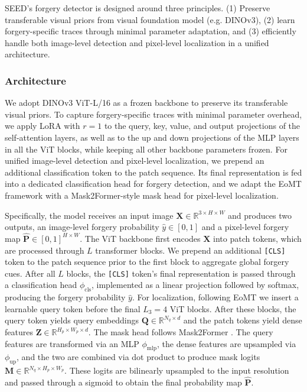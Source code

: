 \documentclass[sigconf, screen, review, anonymous]{acmart}
\begin{document}
SEED's forgery detector is designed around three principles. (1) Preserve transferable visual priors from visual foundation model (e.g. DINOv3), (2) learn forgery-specific traces through minimal parameter adaptation, and (3) efficiently handle both image-level detection and pixel-level localization in a unified architecture.

\subsubsection{Architecture}

We adopt DINOv3 ViT-L/16 \cite{simeoni2025dinov3} as a frozen backbone to preserve its transferable visual priors. To capture forgery-specific traces with minimal parameter overhead, we apply LoRA \cite{hu2021lora} with $r=1$ to the query, key, value, and output projections of the self-attention layers, as well as to the up and down projections of the MLP layers in all the ViT blocks, while keeping all other backbone parameters frozen. For unified image-level detection and pixel-level localization, we prepend an additional classification token to the patch sequence. Its final representation is fed into a dedicated classification head for forgery detection, and we adapt the EoMT framework \cite{kerssies2025your} with a Mask2Former-style mask head for pixel-level localization.

Specifically, the model receives an input image $\mathbf{X} \in \mathbb{R}^{3 \times H \times W}$ and produces two outputs, an image-level forgery probability $\hat{y} \in [0,1]$ and a pixel-level forgery map $\hat{\mathbf{P}} \in [0,1]^{H \times W}$. The ViT backbone first encodes $\mathbf{X}$ into patch tokens, which are processed through $L$ transformer blocks. We prepend an additional \texttt{[CLS]} token to the patch sequence prior to the first block to aggregate global forgery cues. After all $L$ blocks, the \texttt{[CLS]} token's final representation is passed through a classification head $\phi_{\text{cls}}$, implemented as a linear projection followed by softmax, producing the forgery probability $\hat{y}$. For localization, following EoMT we insert a learnable query token before the final $L_3 = 4$ ViT blocks. After these blocks, the query token yields query embeddings $\mathbf{Q} \in \mathbb{R}^{N_q \times d}$ and the patch tokens yield dense features $\mathbf{Z} \in \mathbb{R}^{H_p \times W_p \times d}$. The mask head follows Mask2Former \cite{cheng2022masked}. The query features are transformed via an MLP $\phi_{\text{mlp}}$, the dense features are upsampled via $\phi_{\text{up}}$, and the two are combined via dot product to produce mask logits $\mathbf{M} \in \mathbb{R}^{N_q \times H_p \times W_p}$. These logits are bilinearly upsampled to the input resolution and passed through a sigmoid to obtain the final probability map $\hat{\mathbf{P}}$.
\end{document}
